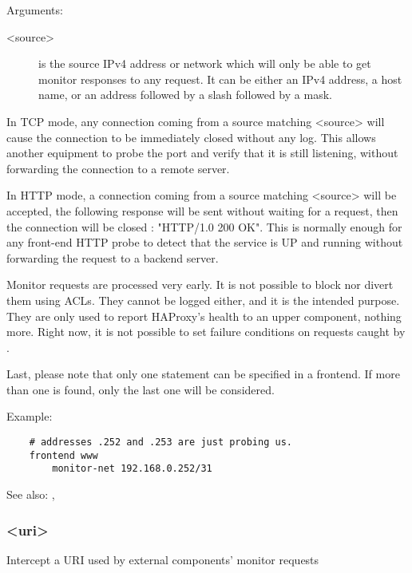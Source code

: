   Arguments:
\begin{description}
\item[ <source>]
              is the source IPv4 address or network which will only be able to
              get monitor responses to any request. It can be either an IPv4
              address, a host name, or an address followed by a slash \chr{/}
              followed by a mask.
\end{description}

  In TCP mode, any connection coming from a source matching <source> will cause
  the connection to be immediately closed without any log. This allows another
  equipment to probe the port and verify that it is still listening, without
  forwarding the connection to a remote server.

  In HTTP mode, a connection coming from a source matching <source> will be
  accepted, the following response will be sent without waiting for a request,
  then the connection will be closed : "HTTP/1.0 200 OK". This is normally
  enough for any front-end HTTP probe to detect that the service is UP and
  running without forwarding the request to a backend server.

  Monitor requests are processed very early. It is not possible to block nor
  divert them using ACLs. They cannot be logged either, and it is the intended
  purpose. They are only used to report HAProxy's health to an upper component,
  nothing more. Right now, it is not possible to set failure conditions on
  requests caught by .

  Last, please note that only one  statement can be specified in
  a frontend. If more than one is found, only the last one will be considered.

  Example:
\begin{verbatim}
    # addresses .252 and .253 are just probing us.
    frontend www
        monitor-net 192.168.0.252/31
\end{verbatim}


See also: , 

\subsubsection[monitor-uri]{ <uri>}

  Intercept a URI used by external components' monitor requests


